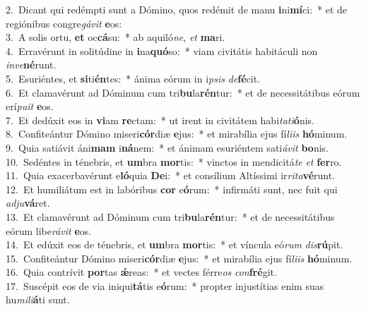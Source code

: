 {2.~}Dicant qui redémpti sunt a Dómino, quos redémit de manu \textbf{i}ni\textbf{mí}ci:~* et de regiónibus congre\textit{gá}\textit{vit} \textbf{e}os:\\
{3.~}A solis ortu, \textbf{et} oc\textbf{cá}su:~* ab aquiló\textit{ne}, \textit{et} \textbf{ma}ri.\\
{4.~}Erravérunt in solitúdine in \textbf{i}na\textbf{quó}so:~* viam civitátis habitáculi non \textit{in}\textit{ve}\textbf{né}runt.\\
{5.~}Esuriéntes, et \textbf{si}ti\textbf{én}tes:~* ánima eórum in i\textit{psis} \textit{de}\textbf{fé}cit.\\
{6.~}Et clamavérunt ad Dóminum cum tri\textbf{bu}la\textbf{rén}tur:~* et de necessitátibus eórum erí\textit{pu}\textit{it} \textbf{e}os.\\
{7.~}Et dedúxit eos in \textbf{vi}am \textbf{re}ctam:~* ut irent in civitátem habi\textit{ta}\textit{ti}\textbf{ó}nis.\\
{8.~}Confiteántur Dómino miseri\textbf{cór}diæ \textbf{e}jus:~* et mirabília ejus fí\textit{li}\textit{is} \textbf{hó}minum.\\
{9.~}Quia satiávit áni\textbf{mam} i\textbf{ná}nem:~* et ánimam esuriéntem sati\textit{á}\textit{vit} \textbf{bo}nis.\\
{10.~}Sedéntes in ténebris, et \textbf{um}bra \textbf{mor}tis:~* vinctos in mendicitá\textit{te} \textit{et} \textbf{fer}ro.\\
{11.~}Quia exacerbavérunt e\textbf{ló}quia \textbf{De}i:~* et consílium Altíssimi ir\textit{ri}\textit{ta}\textbf{vé}runt.\\
{12.~}Et humiliátum est in labóribus \textbf{cor} e\textbf{ó}rum:~* infirmáti sunt, nec fuit qui \textit{ad}\textit{ju}\textbf{vá}ret.\\
{13.~}Et clamavérunt ad Dóminum cum tri\textbf{bu}la\textbf{rén}tur:~* et de necessitátibus eórum libe\textit{rá}\textit{vit} \textbf{e}os.\\
{14.~}Et edúxit eos de ténebris, et \textbf{um}bra \textbf{mor}tis:~* et víncula eó\textit{rum} \textit{dis}\textbf{rú}pit.\\
{15.~}Confiteántur Dómino miseri\textbf{cór}diæ \textbf{e}jus:~* et mirabília ejus fí\textit{li}\textit{is} \textbf{hó}minum.\\
{16.~}Quia contrívit \textbf{por}tas \textbf{ǽ}reas:~* et vectes férre\textit{os} \textit{con}\textbf{fré}git.\\
{17.~}Suscépit eos de via iniqui\textbf{tá}tis e\textbf{ó}rum:~* propter injustítias enim suas hu\textit{mi}\textit{li}\textbf{á}ti sunt.\\
